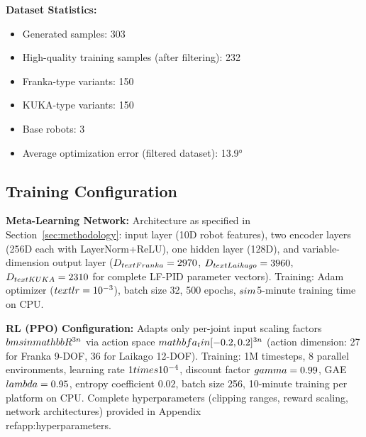 \documentclass[a4paper]{cas-sc}
\begin{document}
\textbf{Dataset Statistics:}
\begin{itemize}
    \item Generated samples: 303
    \item High-quality training samples (after filtering): 232
    \item Franka-type variants: 150
    \item KUKA-type variants: 150
    \item Base robots: 3
    \item Average optimization error (filtered dataset): 13.9°
\end{itemize}

\subsection{Training Configuration}

\textbf{Meta-Learning Network:} Architecture as specified in Section~\ref{sec:methodology}: input layer (10D robot features), two encoder layers (256D each with LayerNorm+ReLU), one hidden layer (128D), and variable-dimension output layer ($D_{\\text{Franka}}=2970$, $D_{\\text{Laikago}}=3960$, $D_{\\text{KUKA}}=2310$ for complete LF-PID parameter vectors). Training: Adam optimizer ($\\text{lr}=10^{-3}$), batch size 32, 500 epochs, $\\sim$5-minute training time on CPU.

\textbf{RL (PPO) Configuration:} Adapts only per-joint input scaling factors $\\bm{s} \\in \\mathbb{R}^{3n}$ via action space $\\mathbf{a}_t \\in [-0.2, 0.2]^{3n}$ (action dimension: 27 for Franka 9-DOF, 36 for Laikago 12-DOF). Training: 1M timesteps, 8 parallel environments, learning rate $1 \\times 10^{-4}$, discount factor $\\gamma=0.99$, GAE $\\lambda=0.95$, entropy coefficient $0.02$, batch size 256, 10-minute training per platform on CPU. Complete hyperparameters (clipping ranges, reward scaling, network architectures) provided in Appendix~\\ref{app:hyperparameters}.
\end{document}
